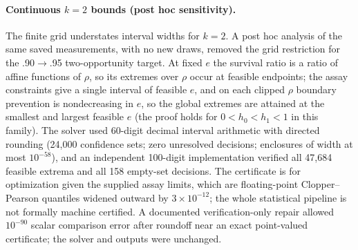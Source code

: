 \paragraph{Continuous $k=2$ bounds (post hoc sensitivity).} The finite grid
understates interval widths for $k=2$. A post hoc analysis of the same saved
measurements, with no new draws, removed the grid restriction for the
.90$\to$.95 two-opportunity target. At fixed $e$ the survival ratio is a ratio of
affine functions of $\rho$, so its extremes over $\rho$ occur at feasible
endpoints; the assay constraints give a single interval of feasible $e$, and on
each clipped $\rho$ boundary prevention is nondecreasing in $e$, so the global
extremes are attained at the smallest and largest feasible $e$ (the proof holds
for $0<h_0<h_1<1$ in this family). The solver used 60-digit decimal interval
arithmetic with directed rounding (24,000 confidence sets; zero unresolved
decisions; enclosures of width at most $10^{-58}$), and an independent 100-digit
implementation verified all 47,684 feasible extrema and all 158 empty-set
decisions. The certificate is for optimization given the supplied assay limits,
which are floating-point Clopper--Pearson quantiles widened outward by
$3\times10^{-12}$; the whole statistical pipeline is not formally machine
certified. A documented verification-only repair allowed $10^{-90}$ scalar
comparison error after roundoff near an exact point-valued certificate; the
solver and outputs were unchanged.

